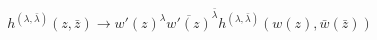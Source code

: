 \begin{equation}
h^{(\lambda,\bar{\lambda})}(z,\bar{z}) \longrightarrow w'(z)^{\lambda}
\overline{w'(z)}^{\bar{\lambda}} h^{(\lambda,\bar{\lambda})}(w(z),\bar{w}(\bar{z}))
\end{equation}

